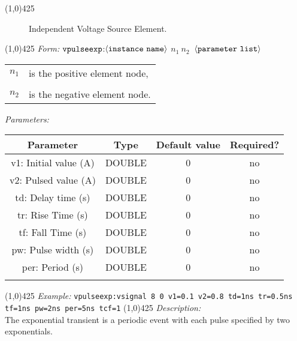 \documentclass{article}
\begin{document}
\hrulefill\linethickness{0.5mm}\line(1,0){425}
\normalsize
\newline
\begin{figure}[h]
\centerline{\epsfxsize=0.5in}
\caption{Independent Voltage Source Element.}
\end{figure}
\newline
\linethickness{0.5mm} \line(1,0){425}
\newline
\textit{Form:}
\newline
$\tt vpulseexp$:$\langle \tt{instance\ name}\rangle$ $n_1\ n_2\ $
$\langle \tt{parameter\ list}\rangle$
\newline
\begin{tabular}{r l}
$n_1$ & is the positive element node, \\
&  \\
$n_2$ & is the negative element node. \\
\end{tabular}
\newline
\textit{Parameters:}
\begin{table}[H]
\begin{tabular}{|c|c|c|c|}
\hline
Parameter&Type&Default value&Required?\\
\hline
v1: Initial value (A) & DOUBLE & 0 & no\\
\hline
v2: Pulsed value (A) & DOUBLE & 0 & no\\
\hline
td: Delay time (s) & DOUBLE & 0 & no\\
\hline
tr: Rise Time  (s) & DOUBLE & 0 & no\\
\hline
tf: Fall Time (s) & DOUBLE & 0 & no\\
\hline
pw: Pulse width (s) & DOUBLE & 0 & no\\
\hline
per: Period (s) & DOUBLE & 0 & no\\
\par
\hline
\end{tabular}
\end{table}
\noindent\linethickness{0.5mm}\line(1,0){425}
\newline
\textit{Example:}
\newline
\texttt{vpulseexp:vsignal\ 8\ 0\ v1=0.1 v2=0.8 td=1ns tr=0.5ns tf=1ns pw=2ns per=5ns
tcf=1}
\newline
\linethickness{0.5mm} \line(1,0){425}
\newline
\textit{Description:}\\
The exponential transient is a periodic event with each pulse specified by two
exponentials. 
\end{document}

